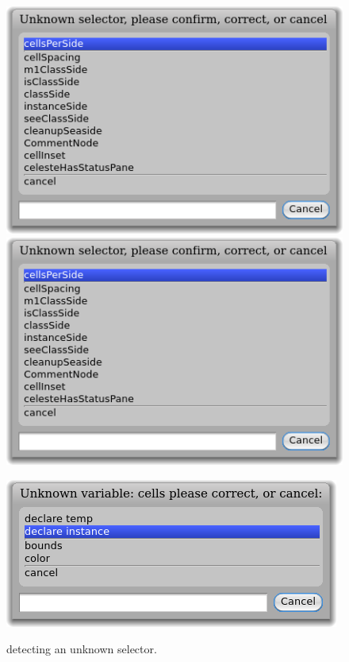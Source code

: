 \documentclass[a4paper,10pt,twoside]{book}
\begin{document}
\begin{figure}[htb]
\begin{minipage}{0.48\textwidth}
	\centering
	\ifluluelse
		{\includegraphics[width=\textwidth]{UnknownSelector}}
		{\includegraphics[scale=0.7]{UnknownSelector}}
	\caption{\pharo detecting an unknown selector.}
\end{minipage}
\hfill
\begin{minipage}{0.48\textwidth}
	\centering
	\ifluluelse
		{\includegraphics[width=\textwidth]{DeclareInstanceVar}}

\end{minipage}
\end{figure}
\end{document}
